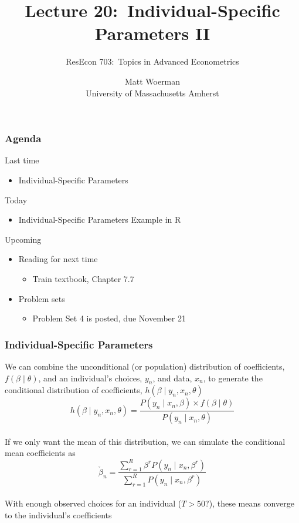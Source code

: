 \documentclass{beamer}
\title[Lecture 20:\ Individual-Specific Parameters II]{Lecture 20:\ Individual-Specific Parameters II}
\author[ResEcon 703:\ Advanced Econometrics]{ResEcon 703:\ Topics in Advanced Econometrics}
\date{Matt Woerman\\University of Massachusetts Amherst}
\begin{document}
{ 
\begin{frame}[noframenumbering]
    \titlepage
\end{frame}
}

\begin{frame}\frametitle{Agenda}
    Last time
    \begin{itemize}
        \item Individual-Specific Parameters
    \end{itemize}
    \vspace{2ex}
    Today
    \begin{itemize}
        \item Individual-Specific Parameters Example in R
    \end{itemize}
    \vspace{2ex}
    Upcoming
    \begin{itemize}
        \item Reading for next time
        \begin{itemize}
            \item Train textbook, Chapter 7.7
        \end{itemize}
        \item Problem sets
        \begin{itemize}
            \item Problem Set 4 is posted, due November 21
        \end{itemize}
    \end{itemize}
\end{frame}

\begin{frame}\frametitle{Individual-Specific Parameters}
    We can combine the unconditional (or population) distribution of coefficients, $f(\beta \mid \theta)$, and an individual's choices, $y_n$, and data, $x_n$, to generate the conditional distribution of coefficients, $h(\beta \mid y_n, x_n, \theta)$
    $$h(\beta \mid y_n, x_n, \theta) = \frac{P(y_n \mid x_n, \beta) \times f(\beta \mid \theta)}{P(y_n \mid x_n, \theta)}$$ \\
    \vspace{2ex}
    If we only want the mean of this distribution, we can simulate the conditional mean coefficients as
    $$\check{\beta}_n = \frac{\sum_{r = 1}^R \beta^r P(y_n \mid x_n, \beta^r)}{\sum_{r = 1}^R P(y_n \mid x_n, \beta^r)}$$ \\
    \vspace{2ex}
    With enough observed choices for an individual ($T > 50$?), these means converge to the individual's coefficients
\end{frame}
\end{document}
